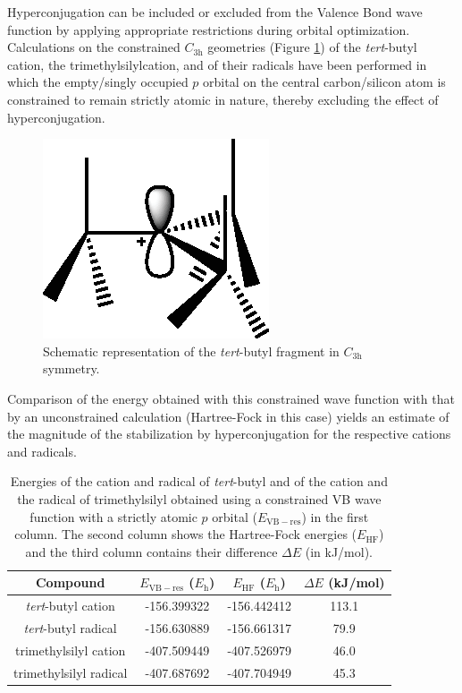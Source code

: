 Hyperconjugation can be included or excluded from the Valence Bond wave function by applying appropriate restrictions during orbital optimization.  Calculations on the constrained $C_\mathrm{3h}$ geometries (Figure \ref{ch3.fig.c3h}) of the \textit{tert}-butyl cation, the trimethylsilylcation, and of their radicals have been performed in which the empty/singly occupied $p$ orbital on the central carbon/silicon atom is constrained to remain strictly atomic in nature, thereby excluding the effect of hyperconjugation.
\begin{figure}[ht]
\center
\includegraphics{dissociation/figures/c3h.eps}
\caption{Schematic representation of the \textit{tert}-butyl fragment in $C_\mathrm{3h}$ symmetry.}
\label{ch3.fig.c3h}
\end{figure}
Comparison of the energy obtained with this constrained wave function with that by an unconstrained calculation  (Hartree-Fock in this case) yields an estimate of the magnitude of the stabilization by hyperconjugation for the respective cations and radicals. 

\begin{table}[htp]
\center
\caption{Energies of the cation and radical of \textit{tert}-butyl and of the cation and the radical of trimethylsilyl obtained using a constrained VB wave function with a strictly atomic $p$ orbital ($E_\mathrm{VB-res}$) in the first column. The second column shows the Hartree-Fock energies ($E_\mathrm{HF}$) and the third column contains their difference $\Delta E$ (in kJ/mol).}
\label{ch3.tab.hyp}
\begin{tabular}{|c|c|c|c|}
\hline
\textbf{Compound} & $E_\mathrm{VB-res}$ ($E_{\mathrm{h}}$) &$E_\mathrm{HF}$ ($E_{\mathrm{h}}$)& $\Delta E$ (kJ/mol)  \\
\hline
\textit{tert}-butyl cation & -156.399322 &-156.442412&113.1  \\
\textit{tert}-butyl radical & -156.630889 &-156.661317&79.9 \\
trimethylsilyl cation & -407.509449&-407.526979&46.0 \\
trimethylsilyl radical &-407.687692&-407.704949&45.3 \\
\hline
\end{tabular}
\end{table}


